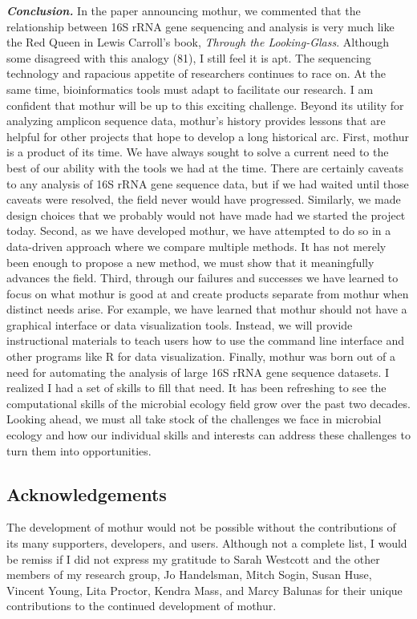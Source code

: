 \documentclass[11pt,]{article}
\begin{document}
\textbf{\emph{Conclusion.}} In the paper announcing mothur, we commented
that the relationship between 16S rRNA gene sequencing and analysis is
very much like the Red Queen in Lewis Carroll's book, \emph{Through the
Looking-Glass}. Although some disagreed with this analogy (81), I still
feel it is apt. The sequencing technology and rapacious appetite of
researchers continues to race on. At the same time, bioinformatics tools
must adapt to facilitate our research. I am confident that mothur will
be up to this exciting challenge. Beyond its utility for analyzing
amplicon sequence data, mothur's history provides lessons that are
helpful for other projects that hope to develop a long historical arc.
First, mothur is a product of its time. We have always sought to solve a
current need to the best of our ability with the tools we had at the
time. There are certainly caveats to any analysis of 16S rRNA gene
sequence data, but if we had waited until those caveats were resolved,
the field never would have progressed. Similarly, we made design choices
that we probably would not have made had we started the project today.
Second, as we have developed mothur, we have attempted to do so in a
data-driven approach where we compare multiple methods. It has not
merely been enough to propose a new method, we must show that it
meaningfully advances the field. Third, through our failures and
successes we have learned to focus on what mothur is good at and create
products separate from mothur when distinct needs arise. For example, we
have learned that mothur should not have a graphical interface or data
visualization tools. Instead, we will provide instructional materials to
teach users how to use the command line interface and other programs
like R for data visualization. Finally, mothur was born out of a need
for automating the analysis of large 16S rRNA gene sequence datasets. I
realized I had a set of skills to fill that need. It has been refreshing
to see the computational skills of the microbial ecology field grow over
the past two decades. Looking ahead, we must all take stock of the
challenges we face in microbial ecology and how our individual skills
and interests can address these challenges to turn them into
opportunities.

\hypertarget{acknowledgements}{%
\subsection{Acknowledgements}\label{acknowledgements}}

The development of mothur would not be possible without the
contributions of its many supporters, developers, and users. Although
not a complete list, I would be remiss if I did not express my gratitude
to Sarah Westcott and the other members of my research group, Jo
Handelsman, Mitch Sogin, Susan Huse, Vincent Young, Lita Proctor, Kendra
Mass, and Marcy Balunas for their unique contributions to the continued
development of mothur.
\end{document}
